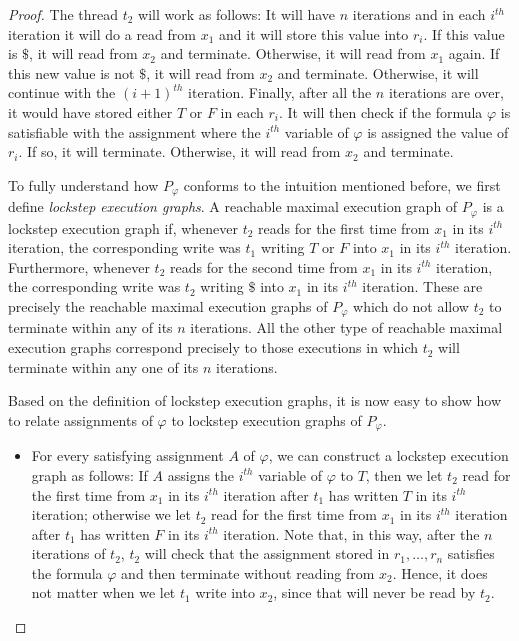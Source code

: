 \begin{proof}
    The thread $t_2$ will work as follows: It will have $n$ iterations and in each $i^{th}$ iteration it will do a read from $x_1$ and it will store this value into $r_i$. If this value is $\$$, it will read from $x_2$ and terminate.
    Otherwise, it will read from $x_1$ again. If this new value is not $\$$, it will
    read from $x_2$ and terminate. Otherwise, it will continue with the $(i+1)^{th}$ iteration. 
    Finally, after all the $n$ iterations are over, it would have stored either $T$ or $F$
    in each $r_i$. It will then check if the formula $\varphi$ is satisfiable
    with the assignment where the $i^{th}$ variable of $\varphi$ is assigned the value of $r_i$. If so,
    it will terminate. Otherwise, it will read from $x_2$ and terminate.

    To fully understand how $P_\varphi$ conforms to the intuition mentioned before,
    we first define \emph{lockstep execution graphs}. A reachable maximal execution graph of $P_\varphi$ is a lockstep execution graph if, whenever $t_2$ reads for the first time from $x_1$ in its $i^{th}$ iteration, the corresponding write was $t_1$ writing $T$ or $F$ into $x_1$
    in its $i^{th}$ iteration. Furthermore, whenever $t_2$ reads for the second time from $x_1$ in its $i^{th}$ iteration, the corresponding write was $t_2$ writing $\$$ into $x_1$ in its $i^{th}$ iteration.
    These are precisely the reachable maximal execution graphs of $P_\varphi$ which do not allow $t_2$ to terminate within any of its $n$ iterations. 
    All the other type of reachable maximal execution graphs correspond precisely to those executions in which $t_2$ will terminate within any one of its $n$ iterations.

    Based on the definition of lockstep execution graphs, it is now easy to
    show how to relate assignments of $\varphi$ to lockstep execution graphs
    of $P_\varphi$.
    \begin{itemize}
        \item For every satisfying assignment $A$ of $\varphi$, we can construct 
        a lockstep execution graph as follows: If $A$ assigns the $i^{th}$ variable of $\varphi$ to $T$, then we let $t_2$ read for the first time from $x_1$ in its $i^{th}$ iteration after $t_1$ has written $T$ in its $i^{th}$ iteration; otherwise we let $t_2$ read for the first time from $x_1$ in its $i^{th}$ iteration
        after $t_1$ has written $F$ in its $i^{th}$ iteration. Note that, in this way, after the $n$ iterations of $t_2$, $t_2$ will check that the assignment stored in $r_1,\dots,r_n$ satisfies the formula $\varphi$ and then terminate without reading from $x_2$. Hence, it does not matter when we let $t_1$ write into $x_2$, since that will never be read by $t_2$. 


\end{itemize}
\end{proof}
